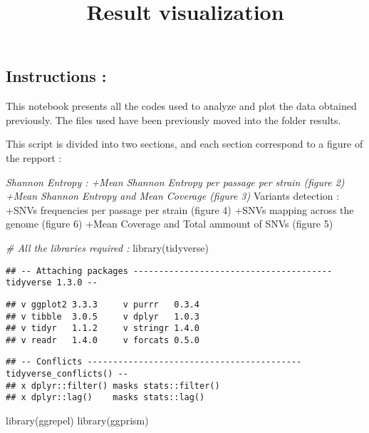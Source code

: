 \documentclass[
]{article}
\title{Result visualization}
\author{}
\date{\vspace{-2.5em}}
\newenvironment{Shaded}{\begin{snugshade}}{\end{snugshade}}
\newcommand{\CommentTok}[1]{\textcolor[rgb]{0.56,0.35,0.01}{\textit{#1}}}
\newcommand{\FunctionTok}[1]{\textcolor[rgb]{0.00,0.00,0.00}{#1}}
\newcommand{\NormalTok}[1]{#1}
\begin{document}
\maketitle

\hypertarget{instructions}{%
\subsection{Instructions :}\label{instructions}}

This notebook presents all the codes used to analyze and plot the data
obtained previously. The files used have been previously moved into the
folder results.

This script is divided into two sections, and each section correspond to
a figure of the repport :

\emph{Shannon Entropy : +Mean Shannon Entropy per passage per strain
(figure 2) +Mean Shannon Entropy and Mean Coverage (figure 3) }Variants
detection : +SNVs frequencies per passage per strain (figure 4) +SNVs
mapping across the genome (figure 6) +Mean Coverage and Total ammount of
SNVs (figure 5)

\begin{Shaded}
\begin{Highlighting}[]
\CommentTok{\# All the libraries required :}
\FunctionTok{library}\NormalTok{(tidyverse)}
\end{Highlighting}
\end{Shaded}

\begin{verbatim}
## -- Attaching packages --------------------------------------- tidyverse 1.3.0 --
\end{verbatim}

\begin{verbatim}
## v ggplot2 3.3.3     v purrr   0.3.4
## v tibble  3.0.5     v dplyr   1.0.3
## v tidyr   1.1.2     v stringr 1.4.0
## v readr   1.4.0     v forcats 0.5.0
\end{verbatim}

\begin{verbatim}
## -- Conflicts ------------------------------------------ tidyverse_conflicts() --
## x dplyr::filter() masks stats::filter()
## x dplyr::lag()    masks stats::lag()
\end{verbatim}

\begin{Shaded}
\begin{Highlighting}[]
\FunctionTok{library}\NormalTok{(ggrepel)}
\FunctionTok{library}\NormalTok{(ggprism)}
\end{Highlighting}
\end{Shaded}
\end{document}
